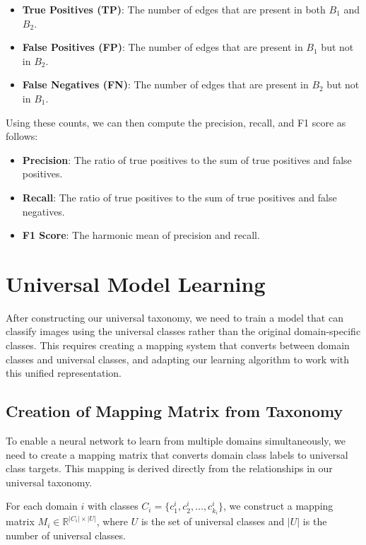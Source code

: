 \begin{itemize}
      \item \textbf{True Positives (TP)}: The number of edges that are present in both $B_1$ and $B_2$.
      \item \textbf{False Positives (FP)}: The number of edges that are present in $B_1$ but not in $B_2$.
      \item \textbf{False Negatives (FN)}: The number of edges that are present in $B_2$ but not in $B_1$.
\end{itemize}

Using these counts, we can then compute the precision, recall, and F1 score as follows:

\begin{itemize}
      \item \textbf{Precision}: The ratio of true positives to the sum of true positives and false positives.
      \item \textbf{Recall}: The ratio of true positives to the sum of true positives and false negatives.
      \item \textbf{F1 Score}: The harmonic mean of precision and recall.
\end{itemize}


\section{Universal Model Learning} \label{sec:universal_model_learning}

After constructing our universal taxonomy, we need to train a model that can classify images
using the universal classes rather than the original domain-specific classes.
This requires creating a mapping system that converts between domain classes and universal classes,
and adapting our learning algorithm to work with this unified representation.

\subsection{Creation of Mapping Matrix from Taxonomy}

To enable a neural network to learn from multiple domains simultaneously,
we need to create a mapping matrix that converts domain class labels to universal class targets.
This mapping is derived directly from the relationships in our universal taxonomy.

For each domain $i$ with classes $C_i = \{c_1^i, c_2^i, \ldots, c_{k_i}^i\}$,
we construct a mapping matrix $M_i \in \mathbb{R}^{|C_i| \times |U|}$,
where $U$ is the set of universal classes and $|U|$ is the number of universal classes.

